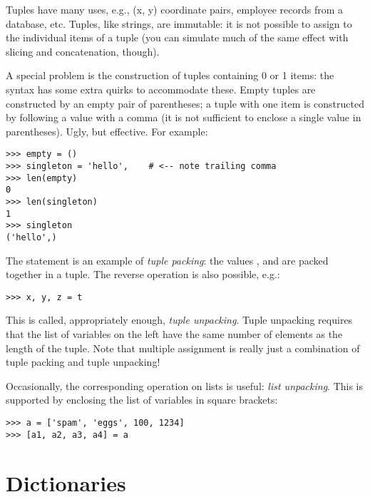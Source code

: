 \documentclass{manual}
\begin{document}
Tuples have many uses, e.g., (x, y) coordinate pairs, employee records
from a database, etc.  Tuples, like strings, are immutable: it is not
possible to assign to the individual items of a tuple (you can
simulate much of the same effect with slicing and concatenation,
though).

A special problem is the construction of tuples containing 0 or 1
items: the syntax has some extra quirks to accommodate these.  Empty
tuples are constructed by an empty pair of parentheses; a tuple with
one item is constructed by following a value with a comma
(it is not sufficient to enclose a single value in parentheses).
Ugly, but effective.  For example:

\begin{verbatim}
>>> empty = ()
>>> singleton = 'hello',    # <-- note trailing comma
>>> len(empty)
0
>>> len(singleton)
1
>>> singleton
('hello',)
\end{verbatim}

The statement  is an example of
\emph{tuple packing}: the values ,  and
 are packed together in a tuple.  The reverse operation
is also possible, e.g.:

\begin{verbatim}
>>> x, y, z = t
\end{verbatim}

This is called, appropriately enough, \emph{tuple unpacking}.  Tuple
unpacking requires that the list of variables on the left have the same
number of elements as the length of the tuple.  Note that multiple
assignment is really just a combination of tuple packing and tuple
unpacking!

Occasionally, the corresponding operation on lists is useful: \emph{list
unpacking}.  This is supported by enclosing the list of variables in
square brackets:

\begin{verbatim}
>>> a = ['spam', 'eggs', 100, 1234]
>>> [a1, a2, a3, a4] = a
\end{verbatim}


\section{Dictionaries \label{dictionaries}}
\end{document}
